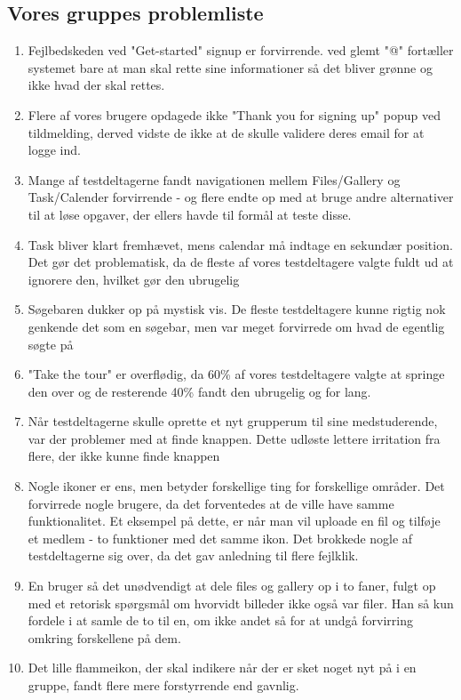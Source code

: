 \documentclass[12pt]{article}
\begin{document}
\subsection*{Vores gruppes problemliste}
\begin{enumerate}
\item Fejlbedskeden ved "Get-started" signup er forvirrende. ved glemt "@" fortæller systemet bare at man skal rette sine informationer så det bliver grønne og ikke hvad der skal rettes.
\item Flere af vores brugere opdagede ikke "Thank you for signing up" popup ved tildmelding, derved vidste de ikke at de skulle validere deres email for at logge ind.
\item Mange af testdeltagerne fandt navigationen mellem Files/Gallery og Task/Calender
forvirrende - og flere endte op med at bruge andre alternativer til at løse opgaver,
der ellers havde til formål at teste disse.
\item Task bliver klart fremhævet, mens calendar må
indtage en sekundær position. Det gør det problematisk, da de fleste af vores
testdeltagere valgte fuldt ud at ignorere den, hvilket gør den ubrugelig
\item Søgebaren dukker op på mystisk vis. De fleste testdeltagere
kunne rigtig nok genkende det som en søgebar, men var meget forvirrede om hvad
de egentlig søgte på
\item "Take the tour" er overflødig, da 60\% af vores testdeltagere valgte at springe den over og de resterende 40\% fandt den ubrugelig og for lang.
\item Når testdeltagerne skulle oprette et nyt grupperum til sine medstuderende, var
der problemer med at finde knappen. Dette udløste lettere irritation fra flere, der
ikke kunne finde knappen
\item Nogle ikoner er ens, men betyder forskellige ting for forskellige områder. Det
forvirrede nogle brugere, da det forventedes at de ville have samme funktionalitet.
Et eksempel på dette, er når man vil uploade en
fil og tilføje et medlem - to funktioner med det samme ikon. Det brokkede nogle af
testdeltagerne sig over, da det gav anledning til flere fejlklik.
\item En bruger så det unødvendigt at dele files og gallery op i to faner, fulgt op med et
retorisk spørgsmål om hvorvidt billeder ikke også var filer. Han så kun fordele i at
samle de to til en, om ikke andet så for at undgå forvirring omkring forskellene på
dem.
\item Det lille flammeikon, der skal indikere når der er sket noget nyt på i en gruppe,
fandt flere mere forstyrrende end gavnlig.
\end{enumerate}
\end{document}
